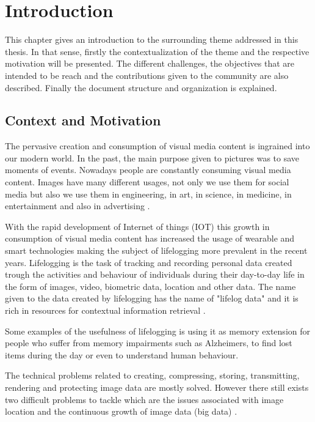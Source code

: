 \cleardoublepage

\chapter{Introduction}
\label{ch:introduction}
This chapter gives an introduction to the surrounding theme addressed in this thesis. In that sense, firstly the contextualization of the theme and the respective motivation will be presented. The different challenges, the objectives that are intended to be reach and the contributions given to the community are also described. Finally the document structure and organization is explained.


\section{Context and Motivation}

The pervasive creation and consumption of visual media content is ingrained into our modern world. In the past, the main purpose given to pictures was to save moments of events. Nowadays people are constantly consuming visual media content. Images have many different usages, not only we use them for social media but also we use them in engineering, in art, in science, in medicine, in entertainment and also in advertising \cite{Zhang2008}.



With the rapid development of Internet of things (IOT) this growth in consumption of visual media content has increased the usage of wearable and smart technologies making the subject of lifelogging more prevalent in the recent years. Lifelogging is the task of tracking and recording personal data created trough the activities and behaviour of individuals during their day-to-day life in the form of images, video, biometric data, location and other data. The name given to the data created by lifelogging has the name of "lifelog data" and it is rich in resources for contextual information retrieval \cite{Ribeiro}.

Some examples of the usefulness of lifelogging is using it as memory extension for people who suffer from memory impairments such as Alzheimers, to find lost items during the day or even to understand human behaviour.


The technical problems related to creating, compressing, storing, transmitting, rendering and protecting image data are mostly solved. However there still exists two difficult problems to tackle which are the issues associated with image location and the continuous growth of image data (big data) \cite{Zhang2008}.

